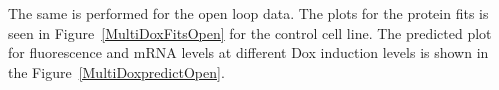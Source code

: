 \documentclass{article}
\begin{document}
The same is performed for the open loop data. The plots for the
protein fits is seen in Figure~\ref{MultiDoxFitsOpen} for the control cell line. The predicted plot for fluorescence and mRNA levels at different Dox induction levels is shown in the Figure~\ref{MultiDoxpredictOpen}.
\pagebreak

\begin{figure}[h!]
\centering
{}

\end{figure}
\end{document}

